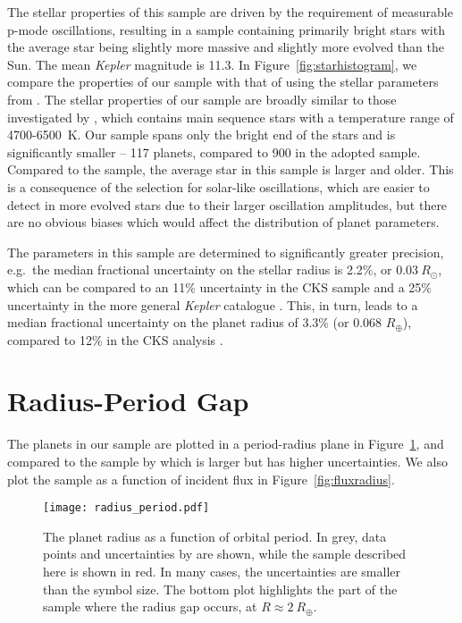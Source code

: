 \documentclass[a4paper,fleqn,usenatbib]{mnras}
\begin{document}
The stellar properties of this sample are driven by the requirement of measurable p-mode oscillations, resulting in a sample containing primarily bright stars with the average star being slightly more massive and slightly more evolved than the Sun. The mean \textit{Kepler} magnitude is 11.3. In Figure~\ref{fig:starhistogram}, we compare the properties of our sample with that of \cite{fulton2017} using the stellar parameters from \cite{petigura2017}. The stellar properties of our sample are broadly similar to those investigated by \cite{fulton2017}, which contains main sequence stars with a temperature range of 4700-6500~K. Our sample spans only the bright end of the \cite{fulton2017} stars and is significantly smaller -- 117 planets, compared to 900 in the adopted \cite{fulton2017} sample.
%
Compared to the \cite{fulton2017} sample, the average star in this sample is larger and older. 
This is a consequence of the selection for solar-like oscillations, which are easier to detect in more evolved stars due to their larger oscillation amplitudes, but there are no obvious biases which would affect the distribution of planet parameters.

The parameters in this sample are determined to significantly greater precision, e.g.\ the median fractional uncertainty on the stellar radius is 2.2\%, or $0.03~R_\odot$, which can be compared to an 11\% uncertainty in the CKS sample \citep{fulton2017} and a 25\% uncertainty in the more general \textit{Kepler} catalogue \citep{huber2014}. This, in turn, leads to a median fractional uncertainty on the planet radius of 3.3\% (or 0.068 $R_\oplus$), compared to 12\% in the CKS analysis \citep{fulton2017}.


\section{Radius-Period Gap}
\label{sec:radiusgap}

The planets in our sample are plotted in a period-radius plane in Figure~\ref{fig:periodradius}, and compared to the sample by \cite{fulton2017} which is larger but has higher uncertainties. We also plot the sample as a function of incident flux in Figure~\ref{fig:fluxradius}.

\begin{figure}
	\texttt{[image: radius\_period.pdf]}
	\caption{The planet radius as a function of orbital period. In grey, data points and uncertainties by \protect\cite{fulton2017} are shown, while the sample described here is shown in red. In many cases, the uncertainties are smaller than the symbol size. The bottom plot highlights the part of the sample where the radius gap occurs, at $R \approx 2~R_\oplus$.}
	\label{fig:periodradius}
\end{figure}
\end{document}
